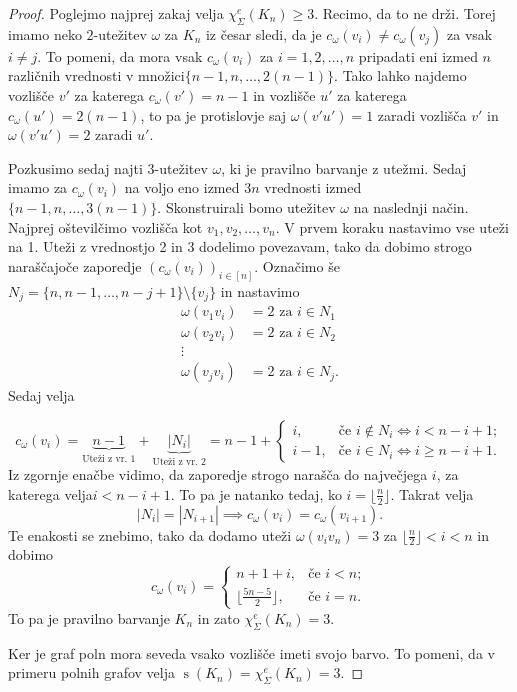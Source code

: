 \documentclass[12pt,a4paper,twoside]{article}
\theoremstyle{definition} %
\theoremstyle{plain} %
\newcommand{\ec}{\chi_{\Sigma}^e}
\numberwithin{equation}{section}  %
\DeclareMathOperator{\s}{s}
\begin{document}
	\begin{proof}


Poglejmo najprej zakaj velja $\ec(K_n) \ge 3$. Recimo, da to ne drži. Torej imamo neko $2$-utežitev $\omega$ za $K_n$ iz česar sledi, da je $c_{\omega}(v_i) \neq c_{\omega}(v_j)$ za vsak $ i \neq j$. To pomeni, da mora vsak $c_{\omega}(v_i)$ za $i=1,2,\ldots,n$ pripadati eni izmed $n$ različnih vrednosti v množici$\{n-1, n, \ldots, 2(n-1)\}$. Tako lahko najdemo vozlišče $v'$ za katerega $c_{\omega}(v') = n-1$ in vozlišče $u'$ za katerega $c_{\omega}(u') = 2(n-1)$, to pa je protislovje saj $\omega(v'u') = 1$ zaradi vozlišča $v'$ in $\omega(v'u') = 2$ zaradi $u'$.

 Pozkusimo sedaj najti $3$-utežitev $\omega$, ki je pravilno barvanje z utežmi. Sedaj imamo za $c_{\omega}(v_i)$ na voljo eno izmed $3n$ vrednosti izmed $\{n-1, n, \ldots, 3(n-1)\}$. Skonstruirali bomo utežitev $\omega$ na naslednji način. Najprej oštevilčimo vozlišča kot $v_1, v_2, \ldots, v_n$. V prvem koraku nastavimo vse uteži na 1. Uteži z vrednostjo 2 in 3 dodelimo povezavam, tako da dobimo strogo naraščajoče zaporedje $\left(c_{\omega}(v_i)\right)_{i \in [n]}$. Označimo še $N_j = \{n, n-1, \ldots, n - j + 1\} \setminus \{v_j\}$ in nastavimo
 \begin{equation*}
 \begin{split}
 \omega(v_1 v_i) &= 2 \text{ za } i \in N_1 \\
 \omega(v_2v_i) &=2 \text{ za } i \in N_2\\
 \vdots \\
 \omega(v_jv_i) &= 2 \text{ za } i \in N_j .
 \end{split}
 \end{equation*}
Sedaj velja 

$$ c_{\omega}(v_i) = \underbrace{n-1}_{\text{Uteži z vr. 1}} + \underbrace{|N_i|}_{\text{Uteži z vr. 2}}   = n-1 + 
\begin{cases}
 i, & \text{če } i\notin N_i \iff i < n - i +1; \\
  i - 1, & \text{če } i \in N_i \iff i \ge n - i + 1.
\end{cases} $$
Iz zgornje enačbe vidimo, da zaporedje strogo narašča do največjega $i$, za katerega velja$ i < n - i +1$. To pa je natanko tedaj, ko $ i =  \lfloor \frac{n}{2}\rfloor$. Takrat velja
$$|N_{i}|  =| N_{i+1}| \implies c_{\omega}(v_i) = c_{\omega}(v_{i+1}).$$
Te enakosti se znebimo, tako da dodamo uteži $\omega(v_iv_n) = 3$ za $\lfloor \frac{n}{2}\rfloor < i < n$ in dobimo
$$c_{\omega}(v_i) =
\begin{cases}
n + 1 + i, & \text{če } i < n; \\
\lfloor \frac{5n-5}{2}\rfloor, & \text{če }i=n.
\end{cases} 
 $$
 To pa je pravilno barvanje $K_n$ in zato $\ec(K_n) = 3$.

Ker je graf poln mora seveda vsako vozlišče imeti svojo barvo. To pomeni, da v primeru polnih grafov velja $\s(K_n) = \ec(K_n) = 3$.
 

\end{proof}
 
\end{document}
